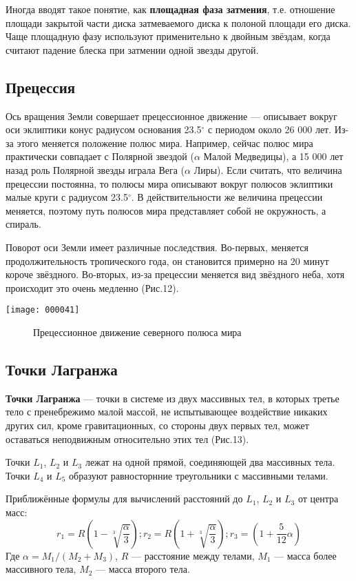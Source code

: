 \documentclass[10pt,a5paper]{article}
\begin{document}
Иногда вводят такое понятие, как \textbf{площадная фаза затмения}, т.е. отношение площади закрытой части диска затмеваемого диска к полоной площади его диска. Чаще площадную фазу используют применительно к двойным звёздам, когда считают падение блеска при затмении одной звезды другой.
\subsection*{Прецессия}

Ось вращения Земли совершает прецессионное движение --- описывает вокруг оси эклиптики  конус радиусом основания 23.5$^\circ$ с периодом около 26 000 лет. Из-за этого меняется положение полюс мира. Например, сейчас полюс мира практически совпадает с Полярной звездой ($\alpha$ Малой Медведицы), а 15 000 лет назад роль Полярной звезды играла Вега ($\alpha$ Лиры). Если считать, что величина прецессии постоянна, то полюсы мира описывают вокруг полюсов эклиптики малые круги с радиусом 23.5$^\circ$. В действительности же величина прецессии меняется, поэтому путь полюсов мира представляет собой не окружность, а спираль.

Поворот оси Земли имеет различные последствия. Во-первых, меняется продолжительность тропического года, он становится примерно на 20 минут короче звёздного. Во-вторых, из-за прецессии меняется вид звёздного неба, хотя происходит это очень медленно (Рис.12).
\begin{center}
\texttt{[image: 000041]}
\begin{figure}[h!]
\caption{Прецессионное движение северного полюса мира}
\end{figure}
\end{center}
\subsection*{Точки Лагранжа}

\textbf{Точки Лагранжа} --- точки в системе из двух массивных тел, в которых третье тело с пренебрежимо малой массой, не испытывающее воздействие никаких других сил, кроме гравитационных, со стороны двух первых тел, может оставаться неподвижным относительно этих тел (Рис.13).

Точки $L_1$, $L_2$ и $L_3$ лежат на одной прямой, соединяющей два массивных тела. Точки $L_4$ и $L_5$ образуют равносторнние треугольники с массивными телами.

Приближённые формулы для вычислений расстояний до $L_1$, $L_2$ и $L_3$ от центра масс:
$$r_1=R\left(1-\sqrt[3]{\frac{\alpha}{3}}\right); r_2=R\left(1+\sqrt[3]{\frac{\alpha}{3}}\right); r_3=\left(1+\frac{5}{12}\alpha\right)$$
Где $\alpha=M_1/(M_2+M_3)$, $R$ --- расстояние между телами, $M_1$ --- масса более массивного тела, $M_2$ --- масса второго тела.
\end{document}
